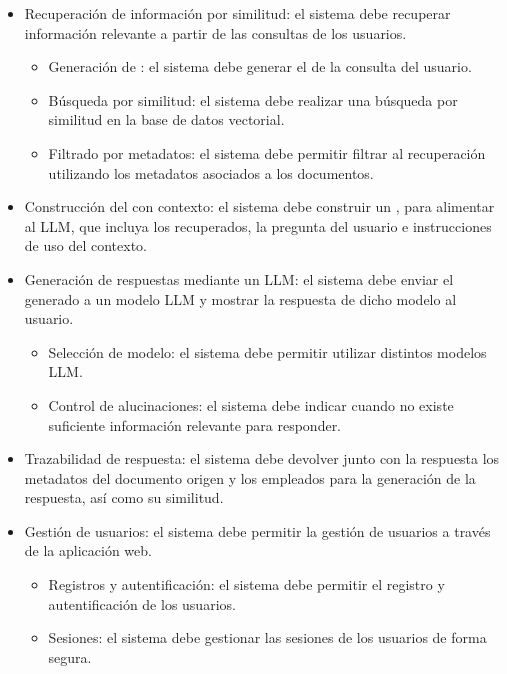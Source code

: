 \begin{itemize}
\begin{itemize}
	\end{itemize}
	\item {} Recuperación de información por similitud: el sistema debe recuperar información relevante a partir de las consultas de los usuarios.
	\begin{itemize}
	\tightlist
		\item {} Generación de : el sistema debe generar el  de la consulta del usuario.
		\item {} Búsqueda por similitud: el sistema debe realizar una búsqueda por similitud en la base de datos vectorial.
		\item {} Filtrado por metadatos: el sistema debe permitir filtrar al recuperación utilizando los metadatos asociados a los documentos.
	\end{itemize}
	\item {} Construcción del  con contexto: el sistema debe construir un , para alimentar al LLM, que incluya los  recuperados, la pregunta del usuario e instrucciones de uso del contexto.
	\item {} Generación de respuestas mediante un LLM: el sistema debe enviar el  generado a un modelo LLM y mostrar la respuesta de dicho modelo al usuario.
	\begin{itemize}
	\tightlist
		\item {} Selección de modelo: el sistema debe permitir utilizar distintos modelos LLM.
		\item {} Control de alucinaciones: el sistema debe indicar cuando no existe suficiente información relevante para responder. 
	\end{itemize}
	\item {} Trazabilidad de respuesta: el sistema debe devolver junto con la respuesta los metadatos del documento origen y los  empleados para la generación de la respuesta, así como su similitud. 
	\item {} Gestión de usuarios: el sistema debe permitir la gestión de usuarios a través de la aplicación web.
	\begin{itemize}
	\tightlist
		\item {} Registros y autentificación: el sistema debe permitir el registro y autentificación de los usuarios.
		\item {} Sesiones: el sistema debe gestionar las sesiones de los usuarios de forma segura.

\end{itemize}
\end{itemize}
